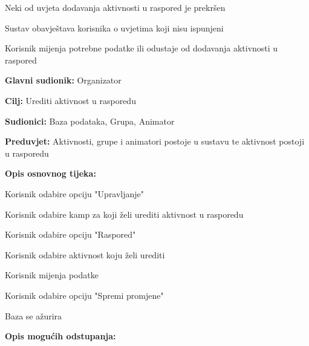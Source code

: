\begin{packed_item}
\begin{packed_item}
\begin{packed_item}
							\item[5.a] Neki od uvjeta dodavanja aktivnosti u raspored je prekršen
							\item[] \begin{packed_enum}
								
								\item Sustav obavještava korisnika o uvjetima koji nisu ispunjeni
								\item Korisnik mijenja potrebne podatke ili odustaje od 
								dodavanja aktivnosti u raspored
								
							\end{packed_enum}			
						\end{packed_item}
					\end{packed_item}
				
					\noindent {}
					\begin{packed_item}
						
						\item \textbf{Glavni sudionik: } Organizator
						\item  \textbf{Cilj:} Urediti aktivnost u rasporedu
						\item  \textbf{Sudionici:} Baza podataka, Grupa, Animator
						\item  \textbf{Preduvjet:} Aktivnosti, grupe i animatori postoje u sustavu te aktivnost postoji u rasporedu
						\item  \textbf{Opis osnovnog tijeka:}
						
						\item[] \begin{packed_enum}
							
							\item Korisnik odabire opciju "Upravljanje"
							\item Korisnik odabire kamp za koji želi urediti aktivnost u rasporedu
							\item Korisnik odabire opciju "Raspored"
							\item Korisnik odabire aktivnost koju želi urediti
							\item Korisnik mijenja podatke
							\item Korisnik odabire opciju "Spremi promjene"
							\item Baza se ažurira

						\end{packed_enum}
						
						\item  \textbf{Opis mogućih odstupanja:}
						

\end{packed_item}
\end{packed_item}
